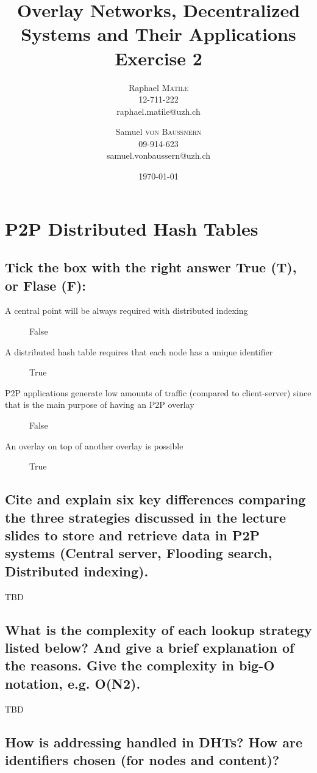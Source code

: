 \documentclass{article}
\title{Overlay Networks, Decentralized Systems and Their Applications
\\Exercise 2}
\author{Raphael \textsc{Matile}\\12-711-222\\raphael.matile@uzh.ch
\and Samuel \textsc{von Baussnern}\\09-914-623\\samuel.vonbaussern@uzh.ch}
\date{\today} %
\begin{document}
\maketitle %

\section{P2P Distributed Hash Tables}

\subsection{Tick the box with the right answer True (T), or Flase (F):}

\begin{description}
  \item[A central point will be always required with distributed indexing]
    False
  \item[A distributed hash table requires that each node has a unique identifier]
    True
  \item[P2P applications generate low amounts of traffic (compared to client-server)
        since that is the main purpose of having an P2P overlay]
    False
  \item[An overlay on top of another overlay is possible]
    True
\end{description}

\subsection{Cite and explain six key differences comparing the three strategies
discussed in the lecture slides to store and retrieve data in P2P systems
(Central server, Flooding search, Distributed indexing).}

TBD

\subsection{What is the complexity of each lookup strategy listed below?
And give a brief explanation of the reasons. Give the
complexity in big-O notation, e.g. O(N2).}

TBD

\subsection{How is addressing handled in DHTs? How are identifiers
chosen (for nodes and content)?}
\end{document}

